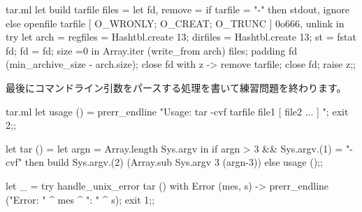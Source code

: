 \begin{answer}
\begin{listingcodefile}{tar.ml}
let build tarfile files =
  let fd, remove =
    if tarfile = "-" then stdout, ignore
    else openfile tarfile [ O_WRONLY; O_CREAT; O_TRUNC ] 0o666, unlink in
  try
    let arch =
         { regfiles = Hashtbl.create 13; dirfiles = Hashtbl.create 13;
           st = fstat fd; fd = fd; size =0 } in
    Array.iter (write_from arch) files;
    padding fd (min_archive_size - arch.size);
    close fd
  with z ->
    remove tarfile; close fd; raise z;;
\end{listingcodefile}
%
最後にコマンドライン引数をパースする処理を書いて練習問題を終わります。
%
\begin{listingcodefile}{tar.ml}
let usage () =
  prerr_endline "Usage: tar -cvf tarfile file1 [ file2 ... ] ";
  exit 2;;

let tar () =
  let argn = Array.length Sys.argv in
  if argn > 3 && Sys.argv.(1) = "-cvf" then
    build Sys.argv.(2) (Array.sub Sys.argv 3 (argn-3))
  else usage ();;

let _ =
  try handle_unix_error tar ()
  with Error (mes, s) ->
    prerr_endline ("Error: " ^ mes ^ ": " ^ s); exit 1;;
\end{listingcodefile}
\end{answer}
